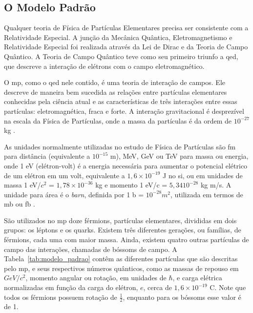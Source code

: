 
\subsection{O Modelo Padrão}
\label{ssec:mp}

Qualquer teoria de Física de Partículas Elementares precisa ser consistente com
a Relatividade Especial. A junção da Mecânica Quântica, Eletromagnetismo e
Relatividade Especial foi realizada através da Lei de Dirac e da Teoria de
Campo Quântico. A Teoria de Campo Quântico teve como seu primeiro triunfo a
\gls{qed}, que descreve a interação de elétrons com o campo
eletromagnético. 

O \gls{mp}, como o \gls{qed} nele contido, é uma teoria de
interação de campos. Ele descreve de maneira 
bem sucedida as relações entre
partículas elementares conhecidas pela ciência atual 
\cite{Intro_Nuclear} e as características de
três interações entre essas partículas:
eletromagnética, fraca e forte. A interação gravitacional é
desprezível na escala da Física de Partículas, onde a massa da partículas é da
ordem de $10^{-27}$ kg \cite{Intro_Standard}.


As unidades normalmente utilizadas no estudo de Física de Partículas são fm para
distância (equivalente a $10^{-15}$ m), MeV, GeV ou TeV para massa ou energia, onde 1
eV (elétron-volt) é a energia necessária para aumentar o potencial elétrico de
um elétron em um volt, equivalente a $1,6\times10^{-19}$ J no \gls{si}, ou em unidades
de massa 1 eV/$c^2$ = $1,78\times10^{-36}$ kg e momento 1 eV/c = $5,34 10^{-28}$ kg m/s. 
A unidade para área é o \emph{barn}, definida por 1 b = $10^{-28} m^2$, utilizada em
termos de mb ou fb \cite{Intro_Nuclear}.

São utilizados no \gls{mp} doze férmions, partículas elementares, divididas em dois grupos: os
léptons e os quarks. Existem três diferentes gerações, ou famílias, de férmions, cada uma com maior
massa. Ainda, existem quatro outras partículas de campo das
interações, chamadas de bóssoms de campo.
A Tabela~\ref{tab:modelo_padrao} contêm as diferentes partículas que são
descritas pelo \gls{mp}, e seus respectivos números quânticos, como as massas de repouso em $GeV/c^2$, momento
angular ou rotação, em unidades de $\hbar$, e carga elétrica normalizadas em função da carga
do elétron, $e$, cerca de $1,6\times10^{-19}$ C. Note que todos os férmions
possuem rotação de $\frac{1}{2}$, enquanto para os bóssoms esse valor é de 1.

